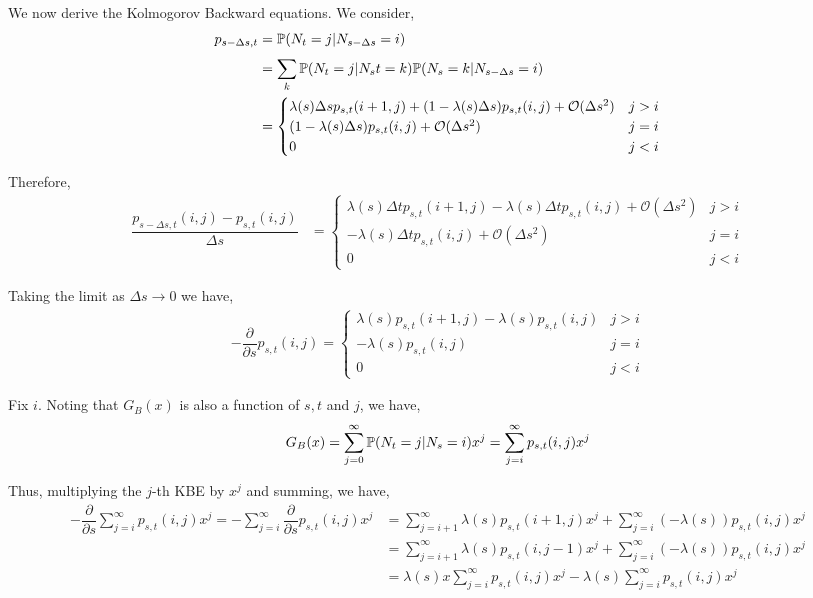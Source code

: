 \begin{solution}[Solution]
We now derive the Kolmogorov Backward equations. We consider,
\begin{align*}
    p_{s-\Delta s,t} &= \mathbb{P}( N_{t} = j | N_{s-\Delta s} = i) \\
    &= \sum_{k}^{} \mathbb{P}(N_{t}=j | N_{s}t = k)\mathbb{P}(N_{s}=k | N_{s-\Delta s}=i) \\
    &= \begin{cases}
        \lambda(s)\Delta s p_{s,t}(i+1,j) 
        +(1-\lambda(s)\Delta s) p_{s,t}(i,j) + \mathcal{O}(\Delta s^2) & j > i \\
        (1-\lambda(s)\Delta s) p_{s,t}(i,j) +\mathcal{O}(\Delta s^2) & j=i \\
        0 & j < i
    \end{cases}
\end{align*}

Therefore,
\begin{align*}
    \dfrac{p_{s-\Delta s,t}(i,j) - p_{s,t}(i,j)}{\Delta s} 
    &= \begin{cases}
        \lambda(s)\Delta t p_{s,t}(i+1,j) 
        -\lambda(s)\Delta t p_{s,t}(i,j) + \mathcal{O}(\Delta s^2) & j > i \\
        -\lambda(s)\Delta t p_{s,t}(i,j) +\mathcal{O}(\Delta s^2) & j=i \\
        0 & j < i
    \end{cases}
\end{align*}

Taking the limit as \( \Delta s \to 0  \) we have,
\begin{align*}
    -\dfrac{\partial}{\partial s}p_{s,t}(i,j) = 
    \begin{cases}
        \lambda(s) p_{s,t}(i+1,j) 
        -\lambda(s)p_{s,t}(i,j) & j > i \\
        -\lambda(s)p_{s,t}(i,j) & j=i \\
        0 & j < i
    \end{cases}
\end{align*}

Fix \( i \). Noting that \( G_B(x) \) is also a function of \( s,t \) and \( j \), we have,
\begin{align*}
    G_B(x) = \sum_{j=0}^{\infty} \mathbb{P}(N_t = j | N_s = i) x^{j} = \sum_{j=i}^{\infty}p_{s,t}(i,j) x^{j} 
\end{align*}

Thus, multiplying the \( j \)-th KBE by \( x^j \) and summing, we have,
\begin{align*}
    -\dfrac{\partial}{\partial s} \sum_{j=i}^{\infty} p_{s,t}(i,j)x^j = 
    -\sum_{j=i}^{\infty} \dfrac{\partial}{\partial s} p_{s,t}(i,j)x^j 
    &= \sum_{j=i+1}^{\infty} \lambda(s) p_{s,t}(i+1,j) x^{j} + \sum_{j=i}^{\infty} (-\lambda(s)) p_{s,t}(i,j) x^j \\
    &= \sum_{j=i+1}^{\infty} \lambda(s) p_{s,t}(i,j-1) x^{j} + \sum_{j=i}^{\infty} (-\lambda(s)) p_{s,t}(i,j) x^j \\
    &= \lambda(s) x\sum_{j=i}^{\infty} p_{s,t}(i,j) x^{j} -\lambda(s) \sum_{j=i}^{\infty} p_{s,t}(i,j) x^j \\
\end{align*}


\end{solution}
